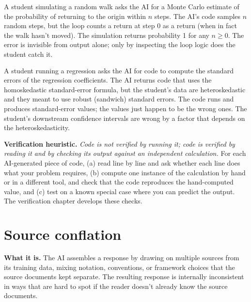 \documentclass[11pt]{book}
\begin{document}
\begin{example}
A student simulating a random walk asks the AI for a Monte Carlo estimate of the probability of returning to the origin within $n$ steps. The AI's code samples $n$ random steps, but the loop counts a return at step $0$ as a return (when in fact the walk hasn't moved). The simulation returns probability 1 for any $n \geq 0$. The error is invisible from output alone; only by inspecting the loop logic does the student catch it.
\end{example}

\begin{example}
A student running a regression asks the AI for code to compute the standard errors of the regression coefficients. The AI returns code that uses the homoskedastic standard-error formula, but the student's data are heteroskedastic and they meant to use robust (sandwich) standard errors. The code runs and produces standard-error values; the values just happen to be the wrong ones. The student's downstream confidence intervals are wrong by a factor that depends on the heteroskedasticity.
\end{example}

\textbf{Verification heuristic.} \emph{Code is not verified by running it; code is verified by reading it and by checking its output against an independent calculation.} For each AI-generated piece of code, (a) read line by line and ask whether each line does what your problem requires, (b) compute one instance of the calculation by hand or in a different tool, and check that the code reproduces the hand-computed value, and (c) test on a known special case where you can predict the output. The verification chapter develops these checks.

\section{Source conflation}
\label{sec:source-conflation}

\textbf{What it is.} The AI assembles a response by drawing on multiple sources from its training data, mixing notation, conventions, or framework choices that the source documents kept separate. The resulting response is internally inconsistent in ways that are hard to spot if the reader doesn't already know the source documents.
\end{document}
